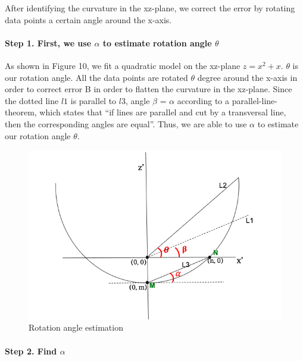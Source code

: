 \documentclass[10pt,letterpaper]{article}
\begin{document}
After identifying the curvature in the xz-plane, we correct the error by
rotating data points a certain angle around the x-axis.

\hypertarget{step-1.-first-we-use-alpha-to-estimate-rotation-angle-theta}{%
\paragraph{\texorpdfstring{Step 1. First, we use \(\alpha\) to estimate
rotation angle
\(\theta\)}{Step 1. First, we use \textbackslash{}alpha to estimate rotation angle \textbackslash{}theta}}\label{step-1.-first-we-use-alpha-to-estimate-rotation-angle-theta}}

As shown in Figure 10, we fit a quadratic model on the xz-plane
\(z=x^2+x\). \(\theta\) is our rotation angle. All the data points are
rotated \(\theta\) degree around the x-axis in order to correct error B
in order to flatten the curvature in the xz-plane. Since the dotted line
\(l1\) is parallel to \(l3\), angle \(\beta\) = \(\alpha\) according to
a parallel-line-theorem, which states that ``if lines are parallel and
cut by a transversal line, then the corresponding angles are equal''.
Thus, we are able to use \(\alpha\) to estimate our rotation angle
\(\theta\).

\begin{figure}[H]
\includegraphics[width=0.9\linewidth]{visualization_paper/rotation_angle} \caption{Rotation angle estimation}\label{fig:Figure10}
\end{figure}

\hypertarget{step-2.-find-alpha}{%
\paragraph{\texorpdfstring{Step 2. Find
\(\alpha\)}{Step 2. Find \textbackslash{}alpha}}\label{step-2.-find-alpha}}
\end{document}
